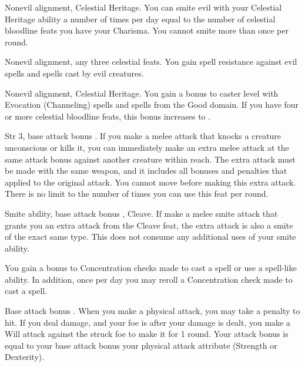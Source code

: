  Nonevil alignment, Celestial Heritage.
 You can smite evil with your Celestial Heritage ability a number of times per day equal to the number of celestial bloodline feats you have \add your Charisma. You cannot smite more than once per round.

 Nonevil alignment, any three celestial feats.
 You gain spell resistance against evil spells and spells cast by evil creatures.

 Nonevil alignment, Celestial Heritage.
 You gain a  bonus to caster level with Evocation (Channeling) spells and spells from the Good domain. If you have four or more celestial bloodline feats, this bonus increases to .

 Str 3, base attack bonus .
 If you make a melee attack that knocks a creature unconscious or kills it, you can immediately make an extra melee attack at the same attack bonus against another creature within reach. The extra attack must be made with the same weapon, and it includes all bonuses and penalties that applied to the original attack. You cannot move before making this extra attack. There is no limit to the number of times you can use this feat per round.

\featpre Smite ability, base attack bonus , Cleave.
\featben If make a melee smite attack that grants you an extra attack from the Cleave feat, the extra attack is also a smite of the exact same type. This does not consume any additional uses of your smite ability.

 You gain a  bonus to Concentration checks made to cast a spell or use a spell-like ability. In addition, once per day you may reroll a Concentration check made to cast a spell.

\featpre Base attack bonus .
\featben When you make a physical attack, you may take a  penalty to hit. If you deal damage, and your foe is \bloodied after your damage is dealt, you make a Will attack against the struck foe to make it \confused for 1 round. Your attack bonus is equal to your base attack bonus \add your physical attack attribute (Strength or Dexterity).

